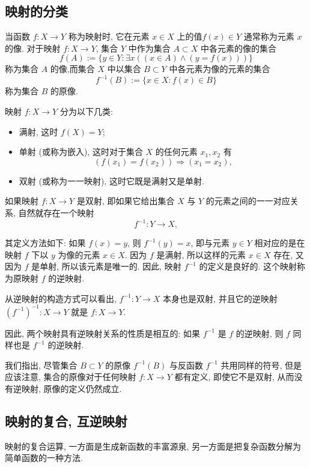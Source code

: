 \documentclass{ctexart}
\begin{document}
\subsection{映射的分类}

当函数 $f: X \rightarrow Y$ 称为映射时, 它在元素 $x \in X$ 上的值$f(x) \in Y$ 通常称为元素 $x$ 的像.
对于映射 $f: X \rightarrow Y$, 集合 $Y$ 中作为集合 $A \subset X$ 中各元素的像的集合
$$
f(A):=\{y \in Y : \exists x((x \in A) \wedge(y=f(x)))\}
$$
称为集合 $A$ 的像,而集合 $X$ 中以集合 $B \subset Y$ 中各元素为像的元素的集合
$$
f^{-1}(B):=\{x \in X : f(x) \in B\}
$$
称为集合 $B$ 的原像.

映射 $f: X \rightarrow Y$ 分为以下几类:
\begin{itemize}
    \item 满射, 这时 $f(X)=Y$;
    \item 单射 (或称为嵌入), 这时对于集合 $X$ 的任何元素 $x_1, x_2$ 有
$$
\left(f\left(x_1\right)=f\left(x_2\right)\right) \Rightarrow\left(x_1=x_2\right),
$$
\item 双射 (或称为一一映射), 这时它既是满射又是单射.
\end{itemize}

如果映射 $f: X \rightarrow Y$ 是双射, 即如果它给出集合 $X$ 与 $Y$ 的元素之间的一一对应关系, 自然就存在一个映射
$$
f^{-1}: Y \rightarrow X,
$$

其定义方法如下: 如果 $f(x)=y$, 则 $f^{-1}(y)=x$, 即与元素 $y \in Y$ 相对应的是在映射 $f$ 下以 $y$ 为像的元素 $x \in X$. 因为 $f$ 是满射, 所以这样的元素 $x \in X$ 存在, 又因为 $f$ 是单射, 所以该元素是唯一的. 因此, 映射 $f^{-1}$ 的定义是良好的. 这个映射称为原映射 $f$ 的逆映射.

从逆映射的构造方式可以看出, $f^{-1}: Y \rightarrow X$ 本身也是双射, 并且它的逆映射 $\left(f^{-1}\right)^{-1}: X \rightarrow Y$ 就是 $f: X \rightarrow Y$.

因此, 两个映射具有逆映射关系的性质是相互的: 如果 $f^{-1}$ 是 $f$ 的逆映射, 则 $f$ 同样也是 $f^{-1}$ 的逆映射.

我们指出, 尽管集合 $B \subset Y$ 的原像 $f^{-1}(B)$ 与反函数 $f^{-1}$ 共用同样的符号, 但是应该注意, 集合的原像对于任何映射 $f: X \rightarrow Y$ 都有定义, 即使它不是双射, 从而没有逆映射, 原像的定义仍然成立.

\subsection{映射的复合, 互逆映射} 映射的复合运算, 一方面是生成新函数的丰富源泉, 另一方面是把复杂函数分解为简单函数的一种方法. 
\end{document}
